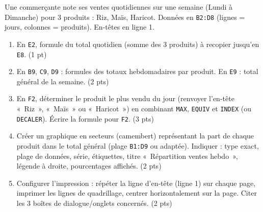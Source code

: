\documentclass[11pt]{article}
\begin{document}
\begin{exercice}
Une commerçante note ses ventes quotidiennes sur une semaine (Lundi à Dimanche) pour 3 produits : Riz, Maïs, Haricot. Données en \texttt{B2:D8} (lignes = jours, colonnes = produits). En-têtes en ligne 1.

\begin{enumerate}
\item En \texttt{E2}, formule du total quotidien (somme des 3 produits) à recopier jusqu'en \texttt{E8}. (1 pt)
\item En \texttt{B9}, \texttt{C9}, \texttt{D9} : formules des totaux hebdomadaires par produit. En \texttt{E9} : total général de la semaine. (2 pts)
\item En \texttt{F2}, déterminer le produit le plus vendu du jour (renvoyer l'en-tête «~Riz~», «~Maïs~» ou «~Haricot~») en combinant \texttt{MAX}, \texttt{EQUIV} et \texttt{INDEX} (ou \texttt{DECALER}). Écrire la formule pour \texttt{F2}. (3 pts)
\item Créer un graphique en secteurs (camembert) représentant la part de chaque produit dans le total général (plage \texttt{B1:D9} ou adaptée). Indiquer : type exact, plage de données, série, étiquettes, titre «~Répartition ventes hebdo~», légende à droite, pourcentages affichés. (2 pts)
\item Configurer l'impression : répéter la ligne d'en-tête (ligne 1) sur chaque page, imprimer les lignes de quadrillage, centrer horizontalement sur la page. Citer les 3 boîtes de dialogue/onglets concernés. (2 pts)
\end{enumerate}
\end{exercice}
\end{document}
